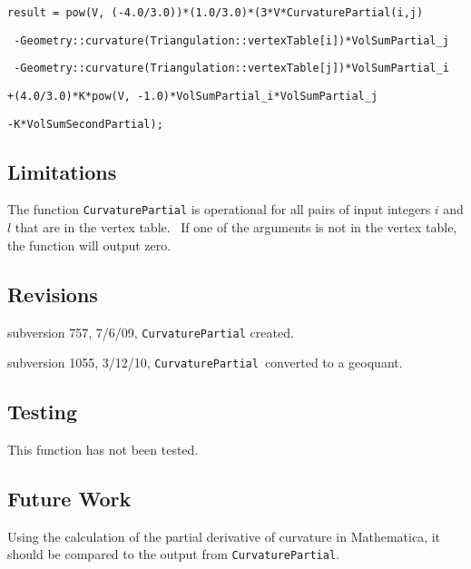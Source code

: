 \qquad \texttt{result = pow(V,
(-4.0/3.0))*(1.0/3.0)*(3*V*CurvaturePartial(i,j)}

\qquad\qquad\qquad \texttt{%
-Geometry::curvature(Triangulation::vertexTable[i])*VolSumPartial\_j}

\qquad\qquad\qquad \texttt{%
-Geometry::curvature(Triangulation::vertexTable[j])*VolSumPartial\_i}

\qquad\qquad\qquad\texttt{+(4.0/3.0)*K*pow(V,
-1.0)*VolSumPartial\_i*VolSumPartial\_j}

\qquad\qquad\qquad\texttt{-K*VolSumSecondPartial);}

\bigskip

\subsection*{Limitations}

The function \texttt{CurvaturePartial} is operational for all pairs of input
integers $i$ and $l$ that are in the vertex table. \ If one of the arguments
is not in the vertex table, the function will output zero. \ 

\subsection*{Revisions}

subversion 757, 7/6/09, \texttt{CurvaturePartial} created.

subversion 1055, 3/12/10, \texttt{CurvaturePartial}\ converted to a geoquant.

\subsection*{Testing}

This function has not been tested.

\subsection*{Future Work}

Using the calculation of the partial derivative of curvature in Mathematica,
it should be compared to the output from \texttt{CurvaturePartial}.
